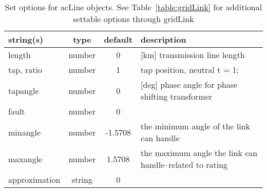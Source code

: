\begin{table}[ht]
\centering
\begin{tabular}{p{5cm} c c p{7cm}}
\hline
string(s) & type & default & description \\
\hline
length & number & 0 & [km] transmission line length\\
tap, ratio & number & 1 & tap position, neutral t = 1;\\
tapangle & number & 0 & [deg] phase angle for phase shifting transformer\\
fault & number & 0 & \\
minangle & number & -1.5708 & the minimum angle of the link can handle\\
maxangle & number & 1.5708 & the maximum angle the link can handle--related to rating\\
approximation & string & 0 & \\
\hline
\end{tabular}
\caption{Set options for acLine objects. See Table~\ref{table:gridLink} for additional settable options through gridLink}
\label{table:acLine}
\end{table}
